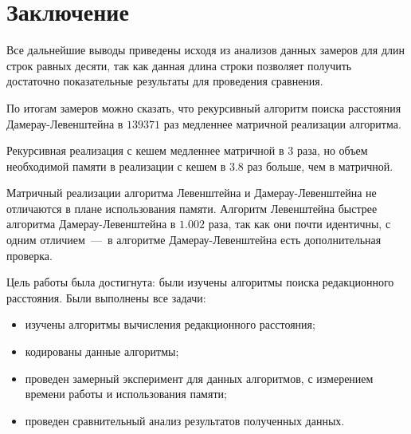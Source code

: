 \chapter*{Заключение}

Все дальнейшие выводы приведены исходя из анализов данных замеров для длин строк равных десяти, так как данная длина строки позволяет получить достаточно показательные результаты для проведения сравнения.

По итогам замеров можно сказать, что рекурсивный алгоритм поиска расстояния Дамерау-Левенштейна в $139 371$ раз медленнее матричной реализации алгоритма.

Рекурсивная реализация с кешем медленнее матричной в $3$ раза, но объем необходимой памяти в реализации с кешем в $3.8$ раз больше, чем в матричной.

Матричный реализации алгоритма Левенштейна и Дамерау-Левенштейна не отличаются в плане использования памяти. Алгоритм Левенштейна быстрее алгоритма Дамерау-Левенштейна в $1.002$ раза, так как они почти идентичны, с одним отличием~---~в алгоритме Дамерау-Левенштейна есть дополнительная проверка.

Цель работы была достигнута: были изучены алгоритмы поиска редакционного расстояния. Были выполнены все задачи:

\begin{itemize}
	\item изучены алгоритмы вычисления редакционного расстояния;
	\item кодированы данные алгоритмы;
	\item проведен замерный эксперимент для данных алгоритмов, с измерением времени работы и использования памяти;
	\item проведен сравнительный анализ результатов полученных данных.
\end{itemize}


\newpage